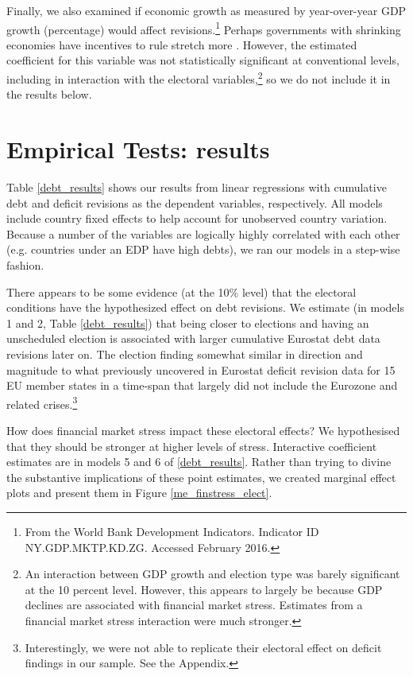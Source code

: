 \documentclass[]{article}
\begin{document}
Finally, we also examined if economic growth as measured by year-over-year GDP growth (percentage) would affect revisions.\footnote{From the World Bank Development Indicators. Indicator ID NY.GDP.MKTP.KD.ZG. Accessed February 2016.} Perhaps governments with shrinking economies have incentives to rule stretch more \citep{DeCastro2013}. However, the estimated coefficient for this variable was not statistically significant at conventional levels, including in interaction with the electoral variables,\footnote{An interaction between GDP growth and election type was barely significant at the 10 percent level. However, this appears to largely be because GDP declines are associated with financial market stress. Estimates from a financial market stress interaction were much stronger.} so we do not include it in the results below.

\section{Empirical Tests: results}

Table \ref{debt_results} shows our results from linear regressions with cumulative debt and deficit revisions as the dependent variables, respectively. All models include country fixed effects to help account for unobserved country variation. Because a number of the variables are logically highly correlated with each other (e.g. countries under an EDP have high debts), we ran our models in a step-wise fashion.

There appears to be some evidence (at the 10\% level) that the electoral conditions have the hypothesized effect on debt revisions. We estimate (in models 1 and 2, Table \ref{debt_results}) that being closer to elections and having an unscheduled election is associated with larger cumulative Eurostat debt data revisions later on. The election finding somewhat similar in direction and magnitude to what \cite{DeCastro2013} previously uncovered in Eurostat deficit revision data for 15 EU member states in a time-span that largely did not include the Eurozone and related crises.\footnote{Interestingly, we were not able to replicate their electoral effect on deficit findings in our sample. See the Appendix.}

How does financial market stress impact these electoral effects? We hypothesised that they should be stronger at higher levels of stress. Interactive coefficient estimates are in models 5 and 6 of \ref{debt_results}. Rather than trying to divine the substantive implications of these point estimates, we created marginal effect plots and present them in Figure \ref{me_finstress_elect}.
\end{document}

